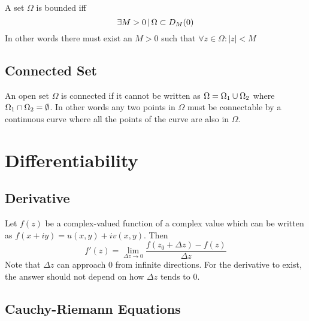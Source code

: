 \documentclass{article}
\begin{document}
A set \(\Omega\) is bounded iff
\[
    \exists M>0 \,|\, \Omega \subset D_M(0)
\]
In other words there must exist an \(M>0\) such that \(\forall z\in \Omega:|z|<M\)

\subsection{Connected Set}

An open set \(\Omega\) is connected if it cannot be written as
\(\Omega=\Omega_1 \cup \Omega_2\) where \(\Omega_1 \cap \Omega_2 = \emptyset\).
In other words any two points in \(\Omega\) must be connectable by a continuous
curve where all the points of the curve are also in \(\Omega\).


\pagebreak

\section{Differentiability}

\subsection{Derivative}

Let \(f(z)\) be a complex-valued function
of a complex value which can be written as
\(f(x+iy)=u(x,y)+iv(x,y)\). Then
\[
    f'(z) = \lim_{\Delta z \to 0} \frac{f(z_0 + \Delta z)-f(z)}{\Delta z}
\]
Note that \(\Delta z\) can approach \(0\) from
infinite directions.
For the derivative to exist, the answer
should not depend on how \(\Delta z\) tends to 0.

\subsection{Cauchy-Riemann Equations}
\end{document}
